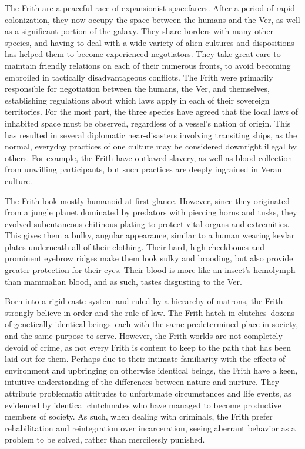 \documentclass[blue]{guildcamp4}
\begin{document}
\name{\bFrith{}}

The Frith are a peaceful race of expansionist spacefarers. After a period of rapid colonization, they now occupy the space between the humans and the Ver, as well as a significant portion of the galaxy. They share borders with many other species, and having to deal with a wide variety of alien cultures and dispositions has helped them to become experienced negotiators. They take great care to maintain friendly relations on each of their numerous fronts, to avoid becoming embroiled in tactically disadvantageous conflicts. The Frith were primarily responsible for negotiation between the humans, the Ver, and themselves, establishing regulations about which laws apply in each of their sovereign territories. For the most part, the three species have agreed that the local laws of inhabited space must be observed, regardless of a vessel's nation of origin. This has resulted in several diplomatic near-disasters involving transiting ships, as the normal, everyday practices of one culture may be considered downright illegal by others. For example, the Frith have outlawed slavery, as well as blood collection from unwilling participants, but such practices are deeply ingrained in Veran culture.
	
The Frith look mostly humanoid at first glance. However, since they originated from a jungle planet dominated by predators with piercing horns and tusks, they evolved subcutaneous chitinous plating to protect vital organs and extremities. This gives them a bulky, angular appearance, similar to a human wearing kevlar plates underneath all of their clothing. Their hard, high cheekbones and prominent eyebrow ridges make them look sulky and brooding, but also provide greater protection for their eyes. Their blood is more like an insect's hemolymph than mammalian blood, and as such, tastes disgusting to the Ver.

Born into a rigid caste system and ruled by a hierarchy of matrons, the Frith strongly believe in order and the rule of law. The Frith hatch in clutches--dozens of genetically identical beings--each with the same predetermined place in society, and the same purpose to serve. However, the Frith worlds are not completely devoid of crime, as not every Frith is content to keep to the path that has been laid out for them. Perhaps due to their intimate familiarity with the effects of environment and upbringing on otherwise identical beings, the Frith have a keen, intuitive understanding of the differences between nature and nurture. They attribute problematic attitudes to unfortunate circumstances and life events, as evidenced by identical clutchmates who have managed to become productive members of society. As such, when dealing with criminals, the Frith prefer rehabilitation and reintegration over incarceration, seeing aberrant behavior as a problem to be solved, rather than mercilessly punished. 
\end{document}
